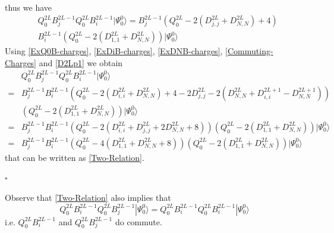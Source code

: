 \documentclass[10pt]{article}
\numberwithin{equation}{section}
\numberwithin{equation}{subsection}
\begin{document}
\begin{itemize}
\begin{align}
\end{align} 
thus we have 
\begin{align}
 &Q_{0}^{2L}B_{j}^{2L-1}Q_{0}^{2L}B_{i}^{2L-1}|\Psi_{0}^{0}\rangle=B_{j}^{2L-1}\left(Q_{0}^{2L}-2(D_{j,j}^{2L}+D_{N,N}^{2L})+4\right)\nonumber\\&B_{i}^{2L-1}\left(Q_{0}^{2L}-2(D_{1,1}^{2L}+D_{N,N}^{2L})\right)|\Psi_{0}^{0}\rangle
\end{align}
Using \eqref{ExQ0B-charges}, \eqref{ExDiB-charges}, \eqref{ExDNB-charges}, \eqref{Commuting-Charges} and \eqref{D2Lp1} we obtain 
\begin{align}
	&Q_{0}^{2L}B_{j}^{2L-1}Q_{0}^{2L}B_{i}^{2L-1}|\Psi_{0}^{0}\rangle\nonumber\\=&B_{j}^{2L-1}B_{i}^{2L-1}\left(Q_{0}^{2L}-2(D_{i,i}^{2L}+D_{N,N}^{2L})+4-2D_{j,j}^{2L}-2(D_{N,N}^{2L}+D_{i,i}^{2L+1}-D_{N,N}^{2L+1})\right)\nonumber\\&\left(Q_{0}^{2L}-2(D_{1,1}^{2L}+D_{N,N}^{2L})\right)|\Psi_{0}^{0}\rangle\nonumber
	\\=&
	B_{j}^{2L-1}B_{i}^{2L-1}\left(Q_{0}^{2L}-2(D_{i,i}^{2L}+D_{j,j}^{2L}+2D_{N,N}^{2L}+8)\right)\left(Q_{0}^{2L}-2(D_{1,1}^{2L}+D_{N,N}^{2L})\right)|\Psi_{0}^{0}\rangle\nonumber
	\\=&
	B_{j}^{2L-1}B_{i}^{2L-1}\left(Q_{0}^{2L}-4(D_{1,1}^{2L}+D_{N,N}^{2L}+8)\right)\left(Q_{0}^{2L}-2(D_{1,1}^{2L}+D_{N,N}^{2L})\right)|\Psi_{0}^{0}\rangle
\end{align}
that can be written as \eqref{Two-Relation}. 
\end{itemize}
\begin{flushright}
	$\square$
\end{flushright}
Observe that \eqref{Two-Relation} also implies that 
\begin{equation}\label{Commutativity-Gained}
	Q_{0}^{2L}B_{i}^{2L-1}Q_{0}^{2L}B_{j}^{2L-1}|\Psi_{0}^{0}\rangle=Q_{0}^{2L}B_{i}^{2L-1}Q_{0}^{2L}B_{i}^{2L-1}|\Psi_{0}^{0}\rangle
\end{equation}
i.e. $Q_{0}^{2L}B_{i}^{2L-1}$ and $Q_{0}^{2L}B_{j}^{2L-1}$ do commute.
\end{document}
